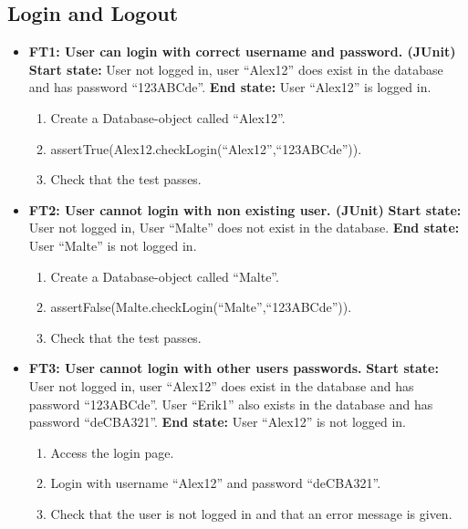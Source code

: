 \documentclass{article}
\begin{document}
\subsection{Login and Logout}
	\begin{itemize}
		\item \textbf{FT1:  User can login with correct username and 			password. (JUnit)} \newline
		\textbf{Start state:} User not logged in, user “Alex12” does exist in the database and has password “123ABCde”. \newline
		\textbf{End state:} User “Alex12” is logged in. 
		\begin{enumerate}
			\item Create a Database-object called “Alex12”.
			\item assertTrue(Alex12.checkLogin(“Alex12”,“123ABCde”)).
			\item Check that the test passes.
		\end{enumerate}
		
		\item \textbf{FT2:  User cannot login with non existing user. (JUnit)} \newline
		\textbf{Start state:} User not logged in, User “Malte” does not exist in the database. \newline
		\textbf{End state:} User “Malte” is not logged in.  
		\begin{enumerate}
			\item Create a Database-object called “Malte”.
			\item assertFalse(Malte.checkLogin(“Malte”,“123ABCde”)). 
			\item Check that the test passes.
		\end{enumerate}
		
		\item \textbf{FT3: User cannot login with other users passwords.} \newline
		\textbf{Start state:} User not logged in, user “Alex12” does exist in the database and has password “123ABCde”. User “Erik1” also exists in the database and has password “deCBA321”. \newline
		\textbf{End state:} User “Alex12” is not logged in.   
		\begin{enumerate}
			\item  Access the login page. 
			\item Login with username “Alex12” and password “deCBA321”. 
			\item Check that the user is not logged in and that an error message is given.
		\end{enumerate}
		

\end{itemize}
\end{document}
